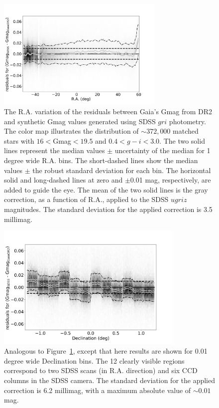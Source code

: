 \begin{figure}[th!]
  \centering\includegraphics[width=8cm]{figures/GmagCorrection_RA_Hess.png} 
\caption{The R.A. variation of the residuals between Gaia's Gmag from DR2
and synthetic Gmag values generated using SDSS $gri$ photometry. The 
color map illustrates the distribution of $\sim 372,000$ matched stars with 
$16<$Gmag$<19.5$ and $0.4 < g-i < 3.0$. The two solid lines represent the 
median values $\pm$ uncertainty of the median for 1 degree wide R.A. bins. 
The short-dashed lines show the median values $\pm$ the robust standard 
deviation for each bin. The horizontal solid and long-dashed lines at zero and 
$\pm$0.01 mag, respectively, are added to guide the eye. The mean of the two 
solid lines is the gray correction, as a function of R.A., applied to the SDSS 
$ugriz$ magnitudes. The standard deviation for the applied correction is 3.5 millimag.}
\label{fig:graycorrRA}
\end{figure}

\begin{figure}[th!]
    \centering\includegraphics[width=9cm]{figures/GmagCorrection_Dec_Hess.png} 
\caption{Analogous to Figure~\ref{fig:graycorrRA}, except that here results are shown for
0.01 degree wide Declination bins. The 12 clearly visible regions correspond to
two SDSS scans (in R.A. direction) and six CCD columns in the SDSS camera. 
The standard deviation for the applied correction is 6.2 millimag, with a maximum
absolute value of $\sim0.01$ mag.}
\label{fig:graycorrDec}
\end{figure}



